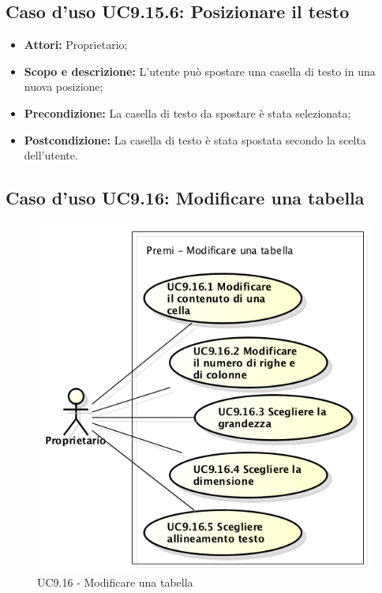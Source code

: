 \subsection{Caso d'uso UC9.15.6: Posizionare il testo}
\begin{itemize}
	\item \textbf{Attori:} Proprietario;
	\item \textbf{Scopo e descrizione:} L'utente può spostare una casella di testo in una nuova posizione;
	\item \textbf{Precondizione:} La casella di testo da spostare è stata selezionata;
	\item \textbf{Postcondizione:} La casella di testo è stata spostata secondo la scelta dell'utente.
\end{itemize}

\newpage
\subsection{Caso d'uso UC9.16: Modificare una tabella}
\begin{figure}[h] 
	\centering 
	\includegraphics[scale=0.45] {img/UC9.16.png} 
	\caption{UC9.16 - Modificare una tabella}
\end{figure}

